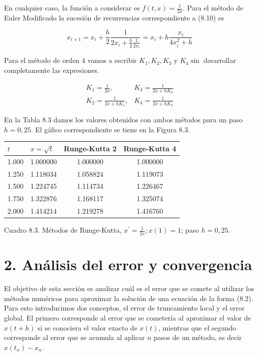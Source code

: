 \documentclass[10pt]{article}
\begin{document}
En cualquier caso, la función a considerar es $f(t, x)=\frac{1}{2 x}$. Para el método de Euler Modificado la sucesión de recurrencias correspondiente a (8.10) es

$$
x_{i+1}=x_{i}+\frac{h}{2} \frac{1}{2 x_{i}+\frac{h}{2} \frac{1}{2 x_{i}}}=x_{i}+h \frac{x_{i}}{4 x_{i}^{2}+h}
$$

Para el método de orden 4 vamos a escribir $K_{1}, K_{2}, K_{3}$ y $K_{4} \sin$ desarrollar completamente las expresiones.

$$
\begin{array}{ll}
K_{1}=\frac{1}{2 x}, & K_{3}=\frac{1}{2 x+h K_{2}} \\
K_{2}=\frac{1}{2 x+h K_{1}}, & K_{4}=\frac{1}{2 x+h K_{3}}
\end{array}
$$

En la Tabla 8.3 damos los valores obtenidos con ambos métodos para un paso $h=0,25$. El gáfico correspondiente se tiene en la Figura 8.3.

\begin{center}
\begin{tabular}{|l|l|c|c|}
\hline
$t$ & $x=\sqrt{t}$ & Runge-Kutta 2 & Runge-Kutta 4 \\
\hline
1.000 & 1.000000 & 1.000000 & 1.000000 \\
1.250 & 1.118034 & 1.058824 & 1.119073 \\
1.500 & 1.224745 & 1.114734 & 1.226467 \\
1.750 & 1.322876 & 1.168117 & 1.325074 \\
2.000 & 1.414214 & 1.219278 & 1.416760 \\
\hline
\end{tabular}
\end{center}

Cuadro 8.3. Métodos de Runge-Kutta, $x^{\prime}=\frac{1}{2 x} ; x(1)=1$; paso $h=0,25$.

\section*{2. Análisis del error y convergencia}
El objetivo de esta sección es analizar cuál es el error que se comete al utilizar los métodos numéricos para aproximar la solución de una ecuación de la forma (8.2). Para esto introducimos dos conceptos, el error de truncamiento local y el error global. El primero corresponde al error que se cometería al aproximar el valor de $x(t+h)$ si se conociera el valor exacto de $x(t)$, mientras que el segundo corresponde al error que se acumula al aplicar $n$ pasos de un método, es decir $x\left(t_{n}\right)-x_{n}$.
\end{document}
